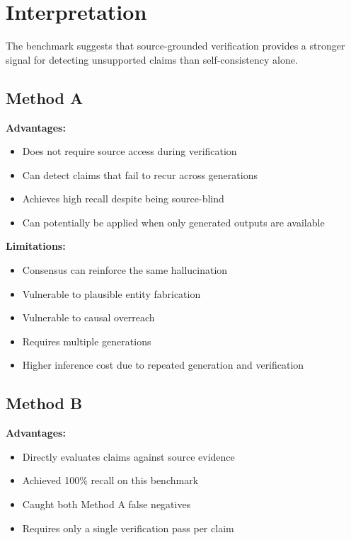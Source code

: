 \documentclass[11pt,a4paper]{article}
\begin{document}
\section{Interpretation}

The benchmark suggests that source-grounded verification provides a stronger signal for detecting unsupported claims than self-consistency alone.

\subsection{Method A}

\textbf{Advantages:}

\begin{itemize}
    \item Does not require source access during verification
    \item Can detect claims that fail to recur across generations
    \item Achieves high recall despite being source-blind
    \item Can potentially be applied when only generated outputs are available
\end{itemize}

\textbf{Limitations:}

\begin{itemize}
    \item Consensus can reinforce the same hallucination
    \item Vulnerable to plausible entity fabrication
    \item Vulnerable to causal overreach
    \item Requires multiple generations
    \item Higher inference cost due to repeated generation and verification
\end{itemize}

\subsection{Method B}

\textbf{Advantages:}

\begin{itemize}
    \item Directly evaluates claims against source evidence
    \item Achieved 100\% recall on this benchmark
    \item Caught both Method A false negatives
    \item Requires only a single verification pass per claim
\end{itemize}
\end{document}
